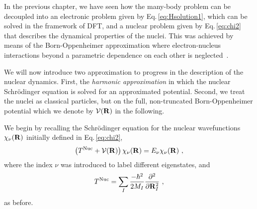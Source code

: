 In the previous chapter, we have seen how the many-body problem can be decoupled into an electronic problem given by Eq.\,\eqref{eq:Hsolution1}, which can be solved in the framework of DFT, and a nuclear problem given by Eq.\,\eqref{eq:chi2} that describes the dynamical properties of the nuclei. This was achieved by means of the Born-Oppenheimer approximation where electron-nucleus interactions beyond a parametric dependence on each other is neglected~\cite{BornOppenheimer}.

We will now introduce two approximation to progress in the description of the nuclear dynamics. First, the \emph{harmonic approximation} in which the nuclear Schr\"odinger equation is solved for an approximated potential. Second, we treat the nuclei as classical particles, but on the full, non-truncated Born-Oppenheimer potential which we denote by $\mathcal V ({\bf R})$ in the following.

We begin by recalling the Schr\"odinger equation for the nuclear wavefunctions $\chi_\nu ({\bf R})$ initially defined in Eq.\,\eqref{eq:chi2},
\begin{align}
  \left( T^{\rm Nuc} + \mathcal V ({\bf R}) \right) \chi_\nu ({\bf R})
  = E_\nu \chi_\nu ({\bf R})~,
  \label{eq:BOSE}
\end{align}
where the index $\nu$ was introduced to label different eigenstates, and
\begin{align}
  T^{\rm Nuc}
    = \sum_I \frac{- \hbar^2}{2 M_I} \frac{\partial^2}{\partial {\bf R}_I^2}~,
  \label{eq:Tnuc2}
\end{align}
as before.

